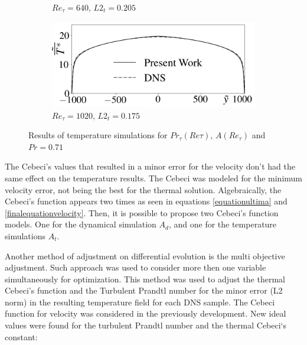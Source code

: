 \documentclass[10pt]{article} %
\begin{document}
\begin{figure}[!h]
\begin{subfigure}[t]{0.5\textwidth}
		\caption{$Re_\tau = 640$, $L2_t = 0.205$}
	\end{subfigure}
	\begin{subfigure}[t]{0.45\textwidth}
		\centering
		\includegraphics[angle=0, scale=0.24]{fotos_formatacao_final/Temperature_1000_071_Prt(Ret)_Avelocity}
		\caption{$Re_\tau = 1020$, $L2_t = 0.175$}
	\end{subfigure}	
	\caption{Results of temperature simulations for $Pr_\tau(Re\tau)$, $A(Re_\tau)$ and $Pr =0.71$ }
\end{figure}

The Cebeci's values that resulted in a minor error for the velocity don't had the same effect on the temperature results. The Cebeci was modeled for the minimum velocity error, not being the best for the thermal solution. Algebraically, the Cebeci's function appears two times as seen in equations \ref{equationultima} and \ref{finalequationvelocity}. Then, it is possible to propose two Cebeci's function models. One for the dynamical simulation $ A_d $, and one for the temperature simulations $ A_t $.     


Another method of adjustment on differential evolution is the multi objective adjustment. Such approach was used to consider more then one variable simultaneously for optimization. This method was used to adjust the thermal Cebeci's function and the Turbulent Prandtl number for the minor error (L2 norm) in the resulting temperature field for each DNS sample. The Cebeci function for velocity was considered in the previously development. New ideal values were found for the turbulent Prandtl number and the thermal Cebeci`s constant:
\end{document}
